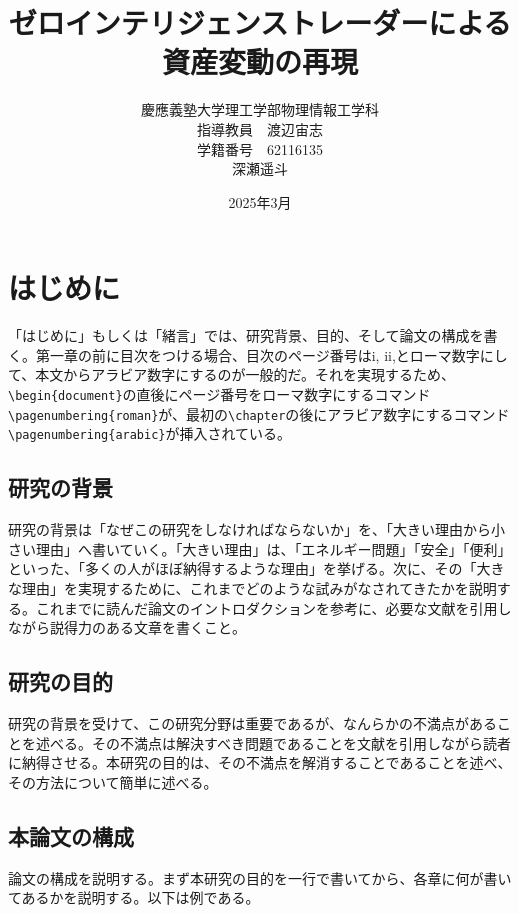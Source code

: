 \documentclass[titlepage]{jsreport}
\title{ゼロインテリジェンストレーダーによる資産変動の再現}
\author{慶應義塾大学理工学部物理情報工学科\\
指導教員　渡辺宙志\\
学籍番号　62116135\\
深瀬遥斗}
\date{2025年3月}
\begin{document}
\maketitle
\setcounter{tocdepth}{2}
\tableofcontents

\chapter{はじめに} \label{chap:introduction}

「はじめに」もしくは「緒言」では、研究背景、目的、そして論文の構成を書く。第一章の前に目次をつける場合、目次のページ番号はi, ii,とローマ数字にして、本文からアラビア数字にするのが一般的だ。それを実現するため、\verb|\begin{document}|の直後にページ番号をローマ数字にするコマンド\verb|\pagenumbering{roman}|が、最初の\verb|\chapter|の後にアラビア数字にするコマンド\verb|\pagenumbering{arabic}|が挿入されている。

\section{研究の背景}

研究の背景は「なぜこの研究をしなければならないか」を、「大きい理由から小さい理由」へ書いていく。「大きい理由」は、「エネルギー問題」「安全」「便利」といった、「多くの人がほぼ納得するような理由」を挙げる。次に、その「大きな理由」を実現するために、これまでどのような試みがなされてきたかを説明する。これまでに読んだ論文のイントロダクションを参考に、必要な文献を引用しながら説得力のある文章を書くこと。

\section{研究の目的}

研究の背景を受けて、この研究分野は重要であるが、なんらかの不満点があることを述べる。その不満点は解決すべき問題であることを文献を引用しながら読者に納得させる。本研究の目的は、その不満点を解消することであることを述べ、その方法について簡単に述べる。

\section{本論文の構成}

論文の構成を説明する。まず本研究の目的を一行で書いてから、各章に何が書いてあるかを説明する。以下は例である。
\end{document}
